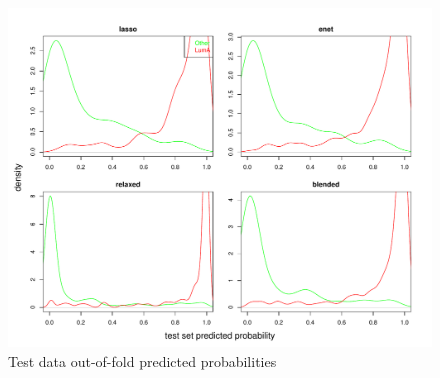 \documentclass[
]{book}
\begin{document}
\begin{figure}
\centering
\includegraphics{Static/figures/brcaRna-glmnetFit-testOOFprobs-1.pdf}
\caption{\label{fig:brcaRna-glmnetFit-testOOFprobs}Test data out-of-fold predicted probabilities}
\end{figure}
\end{document}
